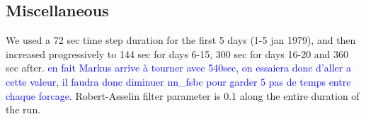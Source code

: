 \normalsize

\subsection{Miscellaneous}

We used a 72 sec time step duration for the first 5 days (1-5 jan 1979), and then increased progressively 
to 144 sec for days 6-15, 300 sec for days 16-20 and 360 sec after. \textcolor{blue}{en fait Markus arrive \`a tourner avec 540sec, on essaiera donc d'aller a cette valeur, 
il faudra donc diminuer nn\_fsbc pour garder 5 pas de temps entre chaque forcage.}
Robert-Asselin filter parameter is 0.1 along the entire duration of the run.

